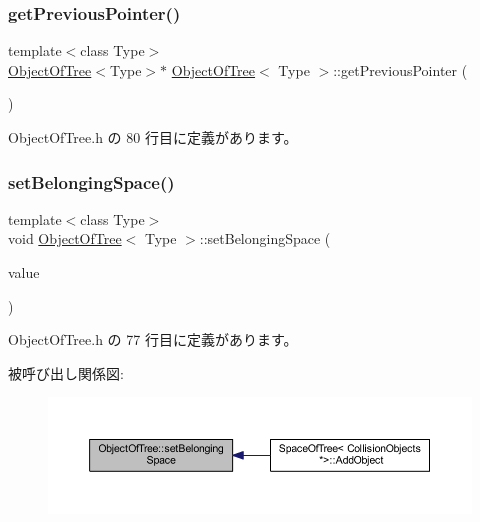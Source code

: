 \subsubsection{\texorpdfstring{get\+Previous\+Pointer()}{getPreviousPointer()}}
{\footnotesize\ttfamily template$<$class Type$>$ \\
\mbox{\hyperlink{class_object_of_tree}{Object\+Of\+Tree}}$<$Type$>$$\ast$ \mbox{\hyperlink{class_object_of_tree}{Object\+Of\+Tree}}$<$ Type $>$\+::get\+Previous\+Pointer (\begin{DoxyParamCaption}{ }\end{DoxyParamCaption})\hspace{0.3cm}{\ttfamily [inline]}}



 Object\+Of\+Tree.\+h の 80 行目に定義があります。

\mbox{\label{class_object_of_tree_a21dc9105d1a5a0d045dc43894bba3c1c}} 
\subsubsection{\texorpdfstring{set\+Belonging\+Space()}{setBelongingSpace()}}
{\footnotesize\ttfamily template$<$class Type$>$ \\
void \mbox{\hyperlink{class_object_of_tree}{Object\+Of\+Tree}}$<$ Type $>$\+::set\+Belonging\+Space (\begin{DoxyParamCaption}\item[{\mbox{\hyperlink{class_space_of_tree}{Space\+Of\+Tree}}$<$ Type $>$ $\ast$}]{value }\end{DoxyParamCaption})\hspace{0.3cm}{\ttfamily [inline]}}



 Object\+Of\+Tree.\+h の 77 行目に定義があります。

被呼び出し関係図\+:\nopagebreak
\begin{figure}[H]
\begin{center}
\leavevmode
\includegraphics[width=350pt]{class_object_of_tree_a21dc9105d1a5a0d045dc43894bba3c1c_icgraph}
\end{center}
\end{figure}
\mbox{\label{class_object_of_tree_a44fb225ed189197bcdfe23dcd2a7fe28}} 
